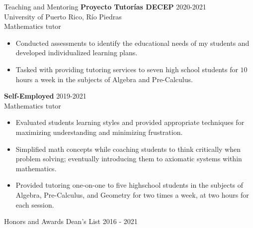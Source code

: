 \documentclass{resume} %
\begin{document}
\begin{rSection}{Teaching and Mentoring}
    \textbf{Proyecto Tutor\'ias DECEP} \hfill{2020-2021} \\
    University of Puerto Rico, R\'io Piedras \\
    Mathematics tutor
    \begin{itemize}
        \item Conducted assessments to identify the educational needs of my
            students and developed individualized learning plans.

        \item Tasked with providing tutoring services to seven high school
            students for $10$ hours a week in the subjects of Algebra and
            Pre-Calculus.
    \end{itemize}

    \textbf{Self-Employed} \hfill{2019-2021} \\
    Mathematics tutor

    \begin{itemize}
        \item Evaluated students learning styles and provided appropriate
            techniques for maximizing understanding and minimizing frustration.

        \item Simplified math concepts while coaching students to think
            critically when problem solving; eventually introducing them to
            axiomatic systems within mathematics.

        \item Provided tutoring one-on-one to five highschool students in the
            subjects of Algebra, Pre-Calculus, and Geometry for two times a
            week, at two hours for each session.
    \end{itemize}
\end{rSection}

\begin{rSection}{Honors and Awards}
    Dean's List \hfill{2016 - 2021}
\end{rSection}
\end{document}
